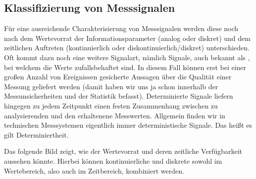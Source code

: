 \documentclass[letterpaper,10pt,english]{jupyterBook}
\begin{document}
\subsection{Klassifizierung von Messsignalen }
\label{\detokenize{content/3_basics:klassifizierung-von-messsignalen-a-id-subsec-klassifizierung-von-messsignalen-a}}
\sphinxAtStartPar
Für eine ausreichende Charakterisierung von Messsignalen werden diese noch nach dem Wertevorrat der Informationsparameter (analog oder diskret) und dem zeitlichen Auftreten (kontinuierlich oder diskontinuierlich/diskret) unterschieden. Oft kommt dazu noch eine weitere Signalart, nämlich  Signale, auch bekannt als , bei welchem die Werte zufallsbehaftet sind. In diesem Fall können erst bei einer großen Anzahl von Ereignissen gesicherte Aussagen über die Qualität einer Messung geliefert werden (damit haben wir uns ja schon innerhalb der Messunsicherheiten und der Statistik befasst).
Determinierte Signale liefern hingegen zu jedem Zeitpunkt einen festen Zusammenhang zwischen zu analysierenden und den erhaltenene Messwerten. Allgemein finden wir in technischen Messsystemen eigentlich immer deterministische Signale. Das heißt es gilt Determiniertheit.

\sphinxAtStartPar
Das folgende Bild zeigt, wie der Wertevorrat und deren zeitliche Verfügbarkeit aussehen könnte. Hierbei können kontinuierliche und diskrete sowohl im Wertebereich, also auch im Zeitbereich, kombiniert werden.

\sphinxAtStartPar
{}
\end{document}
